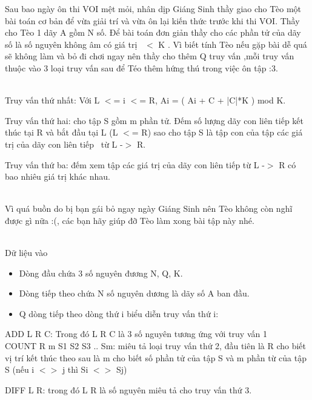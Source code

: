 







     Sau bao ngày ôn thi VOI mệt mỏi, nhân dịp Giáng Sinh thầy giao cho Tèo một bài toán cơ bản để vừa giải trí và vừa ôn lại kiến thức trước khi thi VOI. Thầy cho Tèo 1 dãy A gồm N số. Để bài toán đơn giản thầy cho các phần tử của dãy số là số nguyên không âm có giá trị  $<$ K . Vì biết tính Tèo nếu gặp bài dễ quá sẽ không làm và bỏ đi chơi ngay nên thầy cho thêm Q truy vấn ,mỗi truy vấn thuộc vào 3 loại truy vấn sau để Téo thêm hứng thú trong việc ôn tập :3.    


\\

     Truy vấn thứ nhất: Với L $<$= i $<$= R, Ai = ( Ai + C + |C|*K ) mod K.    

     Truy vấn thứ hai: cho tập S gồm m phần tử. Đếm số lượng dãy con liên tiếp kết thúc tại R và bắt đầu tại L (L $<$= R) sao cho tập S là tập con của tập các giá trị của dãy con liên tiếp  từ L -$>$ R.    

     Truy vấn thứ ba: đếm xem tập các giá trị của dãy con liên tiếp từ L -$>$ R có bao nhiêu giá trị khác nhau.    


\\

     Vì quá buồn do bị bạn gái bỏ ngay ngày Giáng Sinh nên Tèo không còn nghĩ được gì nữa :(, các bạn hãy giúp đỡ Tèo làm xong bài tập này nhé.    


\\

     Dữ liệu vào    
\begin{itemize}
	\item      Dòng đầu chứa 3 số nguyên đương N, Q, K.    
	\item      Dòng tiếp theo chứa N số nguyên dương là dãy số A ban đầu.    
	\item      Q dòng tiếp theo dòng thứ i biểu diễn truy vấn thứ i:    
\end{itemize}

     ADD L R C: Trong đó L R C là 3 số nguyên tương ứng với truy vấn 1     
\\     COUNT R m S1 S2 S3 .. Sm: miêu tả loại truy vấn thứ 2, đầu tiên là R cho biết vị trí kết thúc theo sau là m cho biết số phần tử của tập S và m phần từ của tập S (nếu i $<$$>$ j thì Si $<$$>$ Sj)    

     DIFF L R: trong đó L R là số nguyên miêu tả cho truy vấn thứ 3.    



